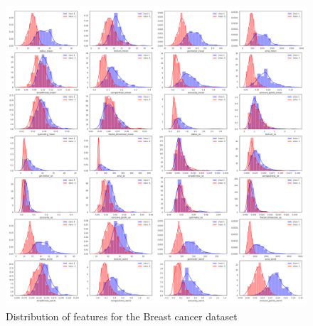 \documentclass{article}
\begin{document}
 
\begin{figure}[]

            \includegraphics[width=18cm]{features_all}
      
        \caption{Distribution of features for the Breast cancer dataset }        
                   
        \label{fig:br}
    \end{figure}
\end{document}
